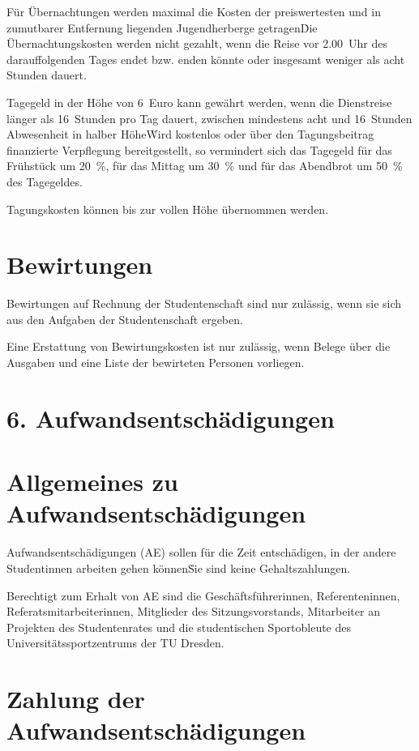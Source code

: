\begin{multicols}{2}
\Abs \Satz Für Übernachtungen werden maximal die Kosten der preiswertesten und in zumutbarer Entfernung liegenden Jugendherberge getragen\. Die Übernachtungskosten werden nicht gezahlt, wenn die Reise vor 2.00~Uhr des darauffolgenden Tages endet bzw. enden könnte oder insgesamt weniger als acht Stunden dauert. 

\Abs \Satz Tagegeld in der Höhe von 6~Euro kann gewährt werden, wenn die Dienstreise länger als 16~Stunden pro Tag dauert, zwischen mindestens acht und 16~Stunden Abwesenheit in halber Höhe\. Wird kostenlos oder über den Tagungsbeitrag finanzierte Verpflegung bereitgestellt, so vermindert sich das Tagegeld für das Frühstück um 20~\%, für das Mittag um 30~\% und für das Abendbrot um 50~\% des Tagegeldes.

\Abs \Satz Tagungskosten können bis zur vollen Höhe übernommen werden.


\section{Bewirtungen}

\Abs \Satz Bewirtungen auf Rechnung der Studentenschaft sind nur zulässig, wenn sie sich aus den Aufgaben der Studentenschaft ergeben.

\Abs \Satz Eine Erstattung von Bewirtungskosten ist nur zulässig, wenn Belege über die Ausgaben und eine Liste der bewirteten Personen vorliegen.


\section*{6. Aufwandsentschädigungen}



\section{Allgemeines zu Aufwandsentschädigungen}

\Abs \Satz Aufwandsentschädigungen (AE) sollen für die Zeit entschädigen, in der andere Studentinnen arbeiten gehen können\. Sie sind keine Gehaltszahlungen.

\Abs \Satz Berechtigt zum Erhalt von AE sind die Geschäftsführerinnen, Referenteninnen, Referatsmitarbeiterinnen, Mitglieder des Sitzungsvorstands, Mitarbeiter an Projekten des Studentenrates und die studentischen Sportobleute des Universitätssportzentrums der TU Dresden.



\section{Zahlung der Aufwandsentschädigungen}


\end{multicols}
